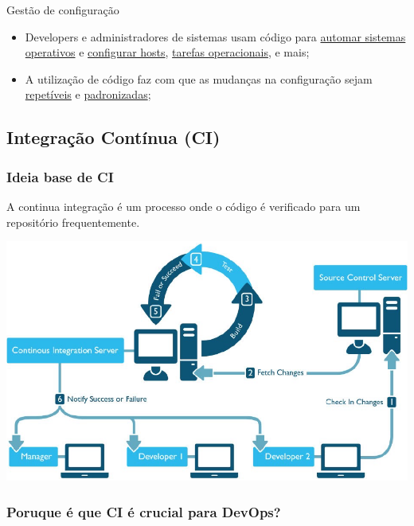 \documentclass{article}
\begin{document}
\vspace{2mm}

Gestão de configuração
\begin{itemize}
  \item Developers e administradores de sistemas usam código para
  \uline{automar sistemas operativos} e \uline{configurar hosts},
  \uline{tarefas operacionais}, e mais;
  \item A utilização de código faz com que as mudanças na configuração
  sejam \uline{repetíveis} e \uline{padronizadas};
\end{itemize}

\subsection{Integração Contínua (CI)}

\subsubsection{Ideia base de CI}

A continua integração é um processo onde o código é
verificado para um repositório frequentemente.

\begin{center}
  \includegraphics[scale=0.55]{38}
\end{center}

\pagebreak

\subsubsection{Poruque é que CI é crucial para DevOps?}
\end{document}
